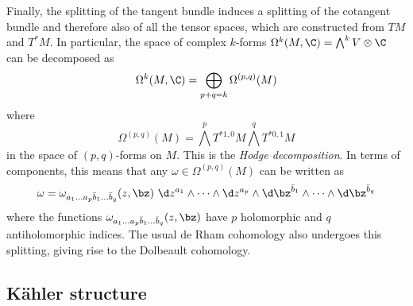 \documentclass{worksheetclass}
\begin{document}
        Finally, the splitting of the tangent bundle induces a splitting of the cotangent bundle and therefore also of all the tensor spaces, which are constructed from $TM$ and $T^*M$. In particular, the space of complex $k$-forms $\Omega^k(M,\C)={\textstyle\bigwedge^k V}\otimes\C$ can be decomposed as
        \begin{equation*}
            \Omega^k(M,\C) = \bigoplus_{p+q=k}\Omega^{(p,q)}(M)
        \end{equation*}
        where
        \begin{equation*}
            \Omega^{(p,q)}(M) = \bigwedge^pT^{*1,0}M\bigwedge^qT^{*0,1}M
        \end{equation*}
        in the space of $(p,q)$-forms on $M$. This is the \emph{Hodge decomposition}. In terms of components, this means that any $\omega\in\Omega^{(p,q)}(M)$ can be written as
        \begin{equation}
            \omega = \omega_{a_1\dots a_p\bar{b}_1\dots\bar{b}_q}(z,\bz)~\d z^{a_1}\wedge\dots\wedge \d z^{a_p}\wedge \d\bz^{\bar{b}_1}\wedge\dots\wedge \d\bz^{\bar{b}_q}
        \end{equation}
        where the functions $\omega_{a_1\dots a_p\bar{b}_1\dots\bar{b}_q}(z,\bz)$ have $p$ holomorphic and $q$ antiholomorphic indices. The usual de Rham cohomology also undergoes this splitting, giving rise to the Dolbeault cohomology.

    \subsection{Kähler structure}
\end{document}
